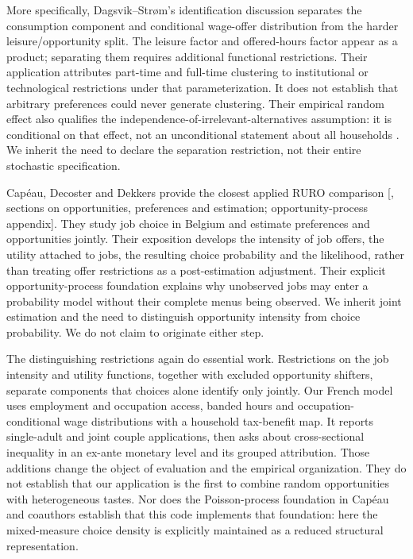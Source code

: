 \documentclass[11pt,a4paper]{article}
\begin{document}
More specifically, Dagsvik--Strøm's identification discussion separates the consumption component and conditional wage-offer distribution from the harder leisure/opportunity split. The leisure factor and offered-hours factor appear as a product; separating them requires additional functional restrictions. Their application attributes part-time and full-time clustering to institutional or technological restrictions under that parameterization. It does not establish that arbitrary preferences could never generate clustering. Their empirical random effect also qualifies the independence-of-irrelevant-alternatives assumption: it is conditional on that effect, not an unconditional statement about all households \citep[identification discussion and empirical specification]{dagsvikstrom2006}. We inherit the need to declare the separation restriction, not their entire stochastic specification.

Capéau, Decoster and Dekkers provide the closest applied RURO comparison {[}\citet{capeau2016}, sections on opportunities, preferences and estimation; opportunity-process appendix{]}. They study job choice in Belgium and estimate preferences and opportunities jointly. Their exposition develops the intensity of job offers, the utility attached to jobs, the resulting choice probability and the likelihood, rather than treating offer restrictions as a post-estimation adjustment. Their explicit opportunity-process foundation explains why unobserved jobs may enter a probability model without their complete menus being observed. We inherit joint estimation and the need to distinguish opportunity intensity from choice probability. We do not claim to originate either step.

The distinguishing restrictions again do essential work. Restrictions on the job intensity and utility functions, together with excluded opportunity shifters, separate components that choices alone identify only jointly. Our French model uses employment and occupation access, banded hours and occupation-conditional wage distributions with a household tax-benefit map. It reports single-adult and joint couple applications, then asks about cross-sectional inequality in an ex-ante monetary level and its grouped attribution. Those additions change the object of evaluation and the empirical organization. They do not establish that our application is the first to combine random opportunities with heterogeneous tastes. Nor does the Poisson-process foundation in Capéau and coauthors establish that this code implements that foundation: here the mixed-measure choice density is explicitly maintained as a reduced structural representation.
\end{document}
